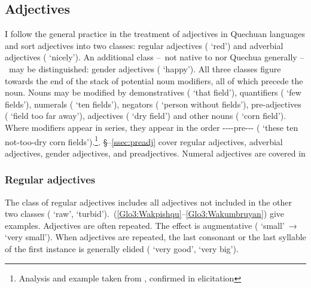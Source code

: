 \subsection{Adjectives}
I follow the general practice in the treatment of adjectives in Quechuan languages and sort \SYQ{} adjectives into two classes: regular adjectives ( ‘red’) and adverbial adjectives ( ‘nicely’). An additional class --~not native to \SYQ{} nor Quechua generally --~may be distinguished: gender adjectives ( ‘happy’). All three classes figure towards the end of the stack of potential noun modifiers, all of which precede the noun. Nouns may be modified by demonstratives (  ‘that field’), quantifiers (  ‘few fields’), numerals (  ‘ten fields’), negators (  ‘person without fields’), pre-adjectives (   ‘field too far away’), adjectives (  ‘dry field’) and other nouns (  ‘corn field’). Where modifiers appear in series, they appear in the order ----pre--- (       ‘these ten not-too-dry corn fields’).\footnote{Analysis and example taken from \citet{Parker76gram}, confirmed in elicitation}. §--\ref{ssec:preadj} cover regular adjectives, adverbial adjectives, gender adjectives, and preadjectives. Numeral adjectives are covered in 

\subsubsection{Regular adjectives}\label{ssec:regadj}
The class of regular adjectives includes all adjectives not included in the other two classes ( ‘raw’,  ‘turbid’).~(\ref{Glo3:Wakpishqu}--\ref{Glo3:Wakumbruyan}) give examples. Adjectives are often repeated. The effect is augmentative ( ‘small’~→~ ‘very small’). When adjectives are repeated, the last consonant or the last syllable of the first instance is generally elided ( ‘very good’,  ‘very big’).\\

